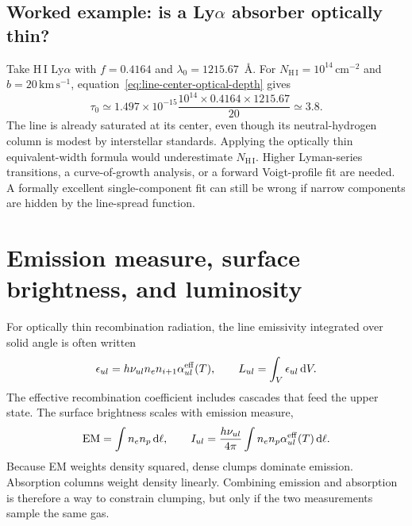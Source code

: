 \subsection{Worked example: is a Ly\texorpdfstring{$\alpha$}{-alpha} absorber optically thin?}

Take H\,I Ly$\alpha$ with $f=0.4164$ and
$\lambda_0=1215.67$~\AA.  For
$N_{\mathrm{H\,I}}=10^{14}\,\mathrm{cm}^{-2}$ and
$b=20\,\mathrm{km\,s^{-1}}$, equation~\eqref{eq:line-center-optical-depth}
gives
\begin{equation}
 \tau_0\simeq1.497\times10^{-15}
 \frac{10^{14}\times0.4164\times1215.67}{20}\simeq3.8.
\end{equation}
The line is already saturated at its center, even though its neutral-hydrogen column
is modest by interstellar standards.  Applying the optically thin equivalent-width
formula would underestimate $N_{\mathrm{H\,I}}$.  Higher Lyman-series transitions,
a curve-of-growth analysis, or a forward Voigt-profile fit are needed.  A formally
excellent single-component fit can still be wrong if narrow components are hidden by
the line-spread function.

\section{Emission measure, surface brightness, and luminosity}

For optically thin recombination radiation, the line emissivity integrated over
solid angle is often written
\begin{equation}
 \epsilon_{ul}=h\nu_{ul}n_en_{i+1}\alpha^{\rm eff}_{ul}(T),
 \qquad
 L_{ul}=\int_V\epsilon_{ul}\,\mathrm{d}V.
 \label{eq:recombination-emissivity}
\end{equation}
The effective recombination coefficient includes cascades that feed the upper state.
The surface brightness scales with emission measure,
\begin{equation}
 {\rm EM}=\int n_en_p\,\mathrm{d}\ell,
 \qquad
 I_{ul}=\frac{h\nu_{ul}}{4\pi}
 \int n_en_p\alpha^{\rm eff}_{ul}(T)\,\mathrm{d}\ell.
 \label{eq:emission-measure}
\end{equation}
Because EM weights density squared, dense clumps dominate emission.  Absorption
columns weight density linearly.  Combining emission and absorption is therefore a
way to constrain clumping, but only if the two measurements sample the same gas.

